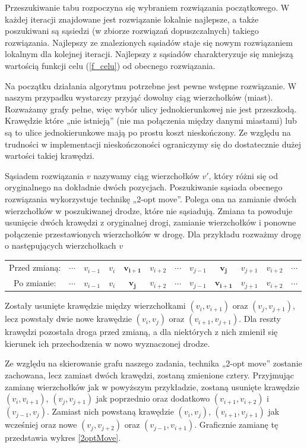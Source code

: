 \documentclass[11pt,a4paper,twoside]{article}
\begin{document}
Przeszukiwanie tabu rozpoczyna się wybraniem rozwiązania początkowego. W każdej iteracji znajdowane jest rozwiązanie lokalnie najlepsze, a także poszukiwani są sąsiedzi (w zbiorze rozwiązań dopuszczalnych) takiego rozwiązania. Najlepszy ze znalezionych sąsiadów staje się nowym rozwiązaniem lokalnym dla kolejnej iteracji. Najlepszy z sąsiadów charakteryzuje się mniejszą wartością funkcji celu (\ref{f_celu}) od obecnego rozwiązania.

Na początku działania algorytmu potrzebne jest pewne wstępne rozwiązanie. W naszym przypadku wystarczy przyjąć dowolny ciąg wierzchołków (miast). Rozważamy grafy pełne, więc wybór ulicy jednokierunkowej nie jest przeszkodą. Krawędzie które „nie istnieją” (nie ma połączenia między danymi miastami) lub są to ulice jednokierunkowe mają po prostu koszt nieskończony. Ze względu na trudności w implementacji nieskończoności ograniczymy się do dostatecznie dużej wartości takiej krawędzi.

Sąsiadem rozwiązania $v$ nazywamy ciąg wierzchołków $v'$, który różni się od oryginalnego na dokładnie dwóch pozycjach. Poszukiwanie sąsiada obecnego rozwiązania wykorzystuje technikę „2-opt move”. Polega ona na zamianie dwóch wierzchołków w poszukiwanej drodze, które nie sąsiadują. Zmiana ta powoduje usunięcie dwóch krawędzi z oryginalnej drogi, zamianie wierzchołków i ponowne połączenie przestawionych wierzchołków w drogę. Dla przykładu rozważmy drogę o następujących wierzchołkach $v$

\bgroup
\def\arraystretch{1.5}
\begin{tabular}{cccccccccccc}
Przed zmianą: & $\cdots$ & $v_{i-1}$ & $v_{i}$ & $\mathbf{v_{i+1}}$ & $v_{i+2}$ & $\cdots$ & $v_{j-1}$ & $\mathbf{v_{j}}$ & $v_{j+1}$ & $v_{i+2}$ & $\cdots$\\
Po zmianie: & $\cdots$ & $v_{i-1}$ & $v_{i}$ & $\mathbf{v_{j}}$ & $v_{i+2}$ & $\cdots$ & $v_{j-1}$ & $\mathbf{v_{i+1}}$ & $v_{j+1}$ & $v_{i+2}$ & $\cdots$\\
\end{tabular}
\egroup

Zostały usunięte krawędzie między wierzchołkami $(v_{i}, v_{i+1})$ oraz $(v_{j}, v_{j+1})$, lecz powstały dwie nowe krawędzie $(v_{i}, v_{j})$ oraz $(v_{i+1}, v_{j+1})$. Dla reszty krawędzi pozostała droga przed zmianą, a dla niektórych z nich zmienił się kierunek ich przechodzenia w nowo wyznaczonej drodze.

Ze względu na skierowanie grafu naszego zadania, technika „2-opt move” zostanie zachowana, lecz zamiast dwóch krawędzi, zostaną zmienione cztery. Przyjmując zamianę wierzchołków jak w powyższym przykładzie, zostaną usunięte krawędzie $(v_{i}, v_{i+1})$, $(v_{j}, v_{j+1})$ jak poprzednio oraz dodatkowo $(v_{i+1}, v_{i+2})$ i $(v_{j-1}, v_{j})$. Zamiast nich powstaną krawędzie $(v_{i}, v_{j})$, $(v_{i+1}, v_{j+1})$ jak wcześniej oraz nowe $(v_{j}, v_{j+2})$ oraz $(v_{j-1}, v_{i+1})$. Graficznie zamianę tę przedstawia wykres \ref{2optMove}.
\end{document}
